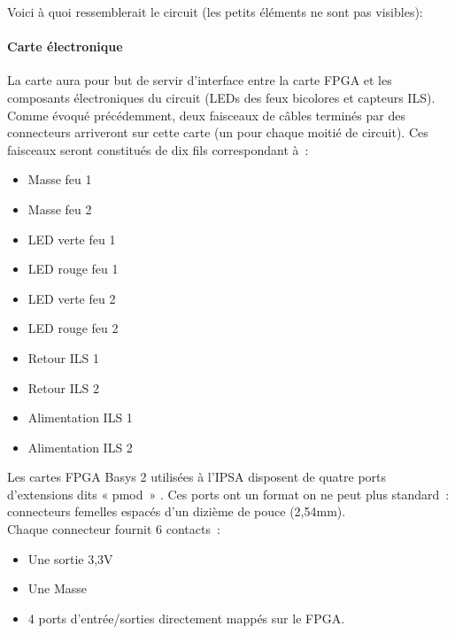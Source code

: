 			Voici à quoi ressemblerait le circuit (les petits éléments ne sont pas visibles):

		\paragraph{Carte électronique}

			La carte aura pour but de servir d’interface entre la carte FPGA et les composants électroniques du circuit (LEDs des feux bicolores et capteurs ILS).\\
			Comme évoqué précédemment, deux faisceaux de câbles terminés par des connecteurs arriveront sur cette carte (un pour chaque moitié de circuit). Ces faisceaux seront constitués de dix fils correspondant à :

			\begin{itemize}
				\item Masse feu 1
				\item Masse feu 2
				\item LED verte feu 1
				\item LED rouge feu 1
				\item LED verte feu 2
				\item LED rouge feu 2
				\item Retour ILS 1
				\item Retour ILS 2
				\item Alimentation ILS 1
				\item Alimentation ILS 2
			\end{itemize}

			Les cartes FPGA Basys 2 utilisées à l’IPSA disposent de quatre ports d’extensions dits « pmod » \cite{bib22}. Ces ports ont un format on ne peut plus standard : connecteurs femelles espacés d’un dizième de pouce (2,54mm).\\
			Chaque connecteur fournit 6 contacts :\\
			\begin{itemize}
				\item Une sortie 3,3V
				\item Une Masse
				\item 4 ports d’entrée/sorties directement mappés sur le FPGA.
			\end{itemize}



